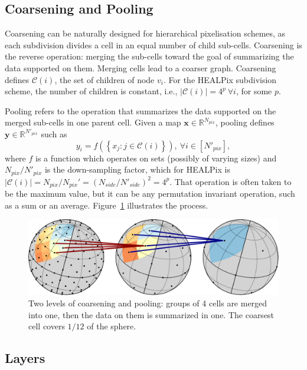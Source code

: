 \documentclass[final,twocolumn,3p,times,sort&compress]{elsarticle}
\newcommand{\figref}[1]{Figure~\ref{fig:#1}}
\renewcommand{\b}[1]{{\bm{#1}}}   %
\newcommand{\1}{\b{1}}              %
\newcommand{\0}{\b{0}}              %
\newcommand{\C}{\mathcal{C}}
\newcommand{\x}{\b{x}}
\newcommand{\y}{\b{y}}
\newcommand{\R}{\mathbb{R}}
\begin{document}
\subsection{Coarsening and Pooling}

Coarsening can be naturally designed for hierarchical pixelisation schemes, as each subdivision divides a cell in an equal number of child sub-cells.
Coarsening is the reverse operation: merging the sub-cells toward the goal of summarizing the data supported on them.
Merging cells lead to a coarser graph.
Coarsening defines $\C(i)$, the set of children of node $v_i$.
For the HEALPix subdivision scheme, the number of children is constant, i.e., $| \C(i) | = 4^p \ \forall i$, for some $p$.

Pooling refers to the operation that summarizes the data supported on the merged sub-cells in one parent cell.
Given a map $\x \in \R^{N_{pix}}$, pooling defines $\y \in \R^{N'_{pix}}$ such as
\begin{equation} \label{eqn:pooling}
	y_i = f \left( \left\{ x_j : j \in \C(i) \right\} \right), \ \forall i \in [N'_{pix}],
\end{equation}
where $f$ is a function which operates on sets (possibly of varying sizes) and $N_{pix} / {N'_{pix}}$ is the down-sampling factor, which for HEALPix is $| \C(i) | = N_{pix} / {N_{pix}}' = (N_{side} / N'_{side})^2 = 4^p$.
That operation is often taken to be the maximum value, but it can be any permutation invariant operation, such as a sum or an average.
\figref{pooling} illustrates the process.


\begin{figure}
	\centering
	\includegraphics[width=\linewidth]{figure_pooling_svg}
	\caption{Two levels of coarsening and pooling: groups of 4 cells are merged into one, then the data on them is summarized in one. The coarsest cell covers $1/12$ of the sphere.}
	\label{fig:pooling}
\end{figure}

\subsection{Layers}
\end{document}
